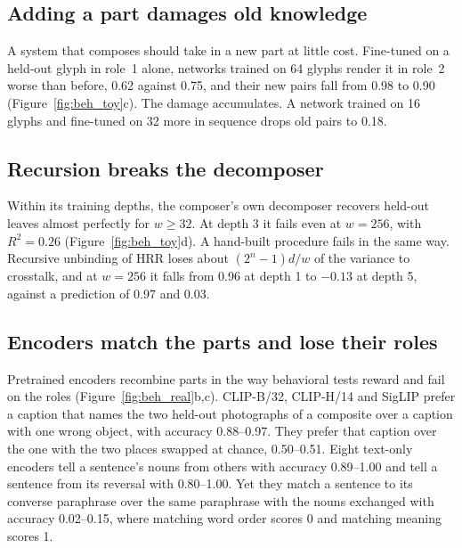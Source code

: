 \documentclass[10pt]{article}
\theoremstyle{plain}
\theoremstyle{remark}
\begin{document}
\subsection{Adding a part damages old knowledge}
\label{sec:adding}

A system that composes should take in a new part at little cost. Fine-tuned on a held-out glyph in role~1 alone, networks trained on 64 glyphs render it in role~2 worse than before, 0.62 against 0.75, and their new pairs fall from 0.98 to 0.90 (Figure~\ref{fig:beh_toy}c). The damage accumulates. A network trained on 16 glyphs and fine-tuned on 32 more in sequence drops old pairs to 0.18.

\subsection{Recursion breaks the decomposer}
\label{sec:depth}

Within its training depths, the composer's own decomposer recovers held-out leaves almost perfectly for $w \ge 32$. At depth 3 it fails even at $w = 256$, with $R^2 = 0.26$ (Figure~\ref{fig:beh_toy}d). A hand-built procedure fails in the same way. Recursive unbinding of HRR loses about $(2^n - 1)d/w$ of the variance to crosstalk, and at $w = 256$ it falls from 0.96 at depth 1 to $-0.13$ at depth 5, against a prediction of 0.97 and 0.03.

\subsection{Encoders match the parts and lose their roles}
\label{sec:beh_encoders}

Pretrained encoders recombine parts in the way behavioral tests reward and fail on the roles (Figure~\ref{fig:beh_real}b,c). CLIP-B/32, CLIP-H/14 and SigLIP prefer a caption that names the two held-out photographs of a composite over a caption with one wrong object, with accuracy 0.88--0.97. They prefer that caption over the one with the two places swapped at chance, 0.50--0.51. Eight text-only encoders tell a sentence's nouns from others with accuracy 0.89--1.00 and tell a sentence from its reversal with 0.80--1.00. Yet they match a sentence to its converse paraphrase over the same paraphrase with the nouns exchanged with accuracy 0.02--0.15, where matching word order scores 0 and matching meaning scores 1.
\end{document}
